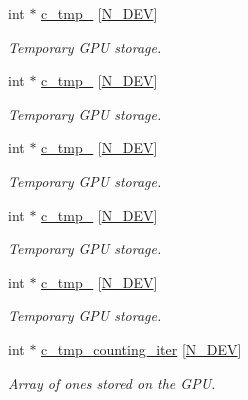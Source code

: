 \begin{DoxyCompactItemize}
int $\ast$ \hyperlink{classMesh_a143a21c2ce68c4b6caa2f7eabd562004}{c\+\_\+tmp\+\_} \mbox{[}\hyperlink{cppspec_8h_a2b674dab7a14f1bf32b48b7fda5022dc}{N\+\_\+\+D\+EV}\mbox{]}
\begin{DoxyCompactList}\small\item\em Temporary G\+PU storage. \end{DoxyCompactList}\item 
int $\ast$ \hyperlink{classMesh_ad875e5453de00af10651239c02bfe821}{c\+\_\+tmp\+\_} \mbox{[}\hyperlink{cppspec_8h_a2b674dab7a14f1bf32b48b7fda5022dc}{N\+\_\+\+D\+EV}\mbox{]}
\begin{DoxyCompactList}\small\item\em Temporary G\+PU storage. \end{DoxyCompactList}\item 
int $\ast$ \hyperlink{classMesh_a139c783dde5036a64bd83c02b65990bd}{c\+\_\+tmp\+\_} \mbox{[}\hyperlink{cppspec_8h_a2b674dab7a14f1bf32b48b7fda5022dc}{N\+\_\+\+D\+EV}\mbox{]}
\begin{DoxyCompactList}\small\item\em Temporary G\+PU storage. \end{DoxyCompactList}\item 
int $\ast$ \hyperlink{classMesh_ad6e01f4bf87d025aa407a79fedbf73fd}{c\+\_\+tmp\+\_} \mbox{[}\hyperlink{cppspec_8h_a2b674dab7a14f1bf32b48b7fda5022dc}{N\+\_\+\+D\+EV}\mbox{]}
\begin{DoxyCompactList}\small\item\em Temporary G\+PU storage. \end{DoxyCompactList}\item 
int $\ast$ \hyperlink{classMesh_af5270c410a5690f1763f5d593d0c9e35}{c\+\_\+tmp\+\_} \mbox{[}\hyperlink{cppspec_8h_a2b674dab7a14f1bf32b48b7fda5022dc}{N\+\_\+\+D\+EV}\mbox{]}
\begin{DoxyCompactList}\small\item\em Temporary G\+PU storage. \end{DoxyCompactList}\item 
int $\ast$ \hyperlink{classMesh_a0db99bf87d3b79d642e99a7ffe23c6b5}{c\+\_\+tmp\+\_\+counting\+\_\+iter} \mbox{[}\hyperlink{cppspec_8h_a2b674dab7a14f1bf32b48b7fda5022dc}{N\+\_\+\+D\+EV}\mbox{]}
\begin{DoxyCompactList}\small\item\em Array of ones stored on the G\+PU. \end{DoxyCompactList}\end{DoxyCompactItemize}


